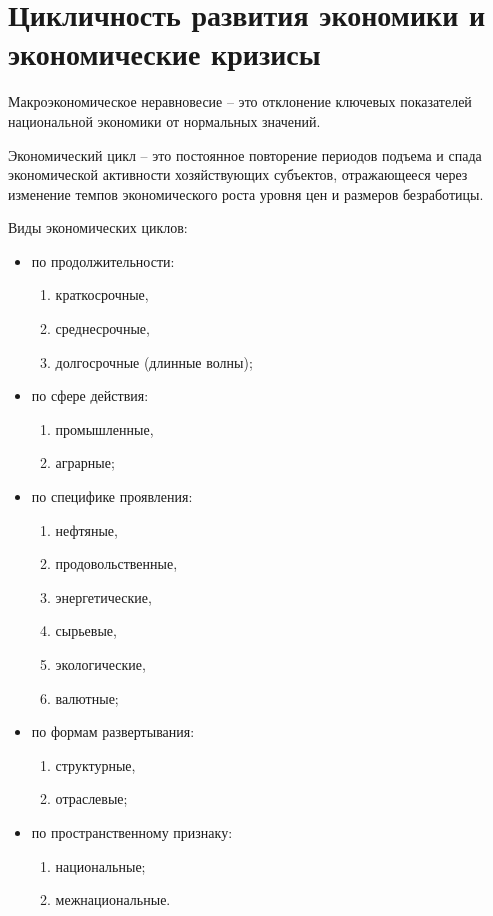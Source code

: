 \section{Цикличность развития экономики и экономические кризисы}

Макроэкономическое неравновесие -- это отклонение ключевых показателей
национальной экономики от нормальных значений.

Экономический цикл -- это постоянное повторение периодов подъема и спада
экономической активности хозяйствующих субъектов, отражающееся через изменение
темпов экономического роста уровня цен и размеров безработицы.

Виды экономических циклов:
\begin{itemize}
    \item по продолжительности:
    \begin{enumerate}
        \item краткосрочные,
        \item среднесрочные,
        \item долгосрочные (длинные волны);
    \end{enumerate}
    \item по сфере действия:
    \begin{enumerate}
        \item промышленные,
        \item аграрные;
    \end{enumerate}
    \item по специфике проявления:
    \begin{enumerate}
        \item нефтяные,
        \item продовольственные,
        \item энергетические,
        \item сырьевые,
        \item экологические,
        \item валютные;
    \end{enumerate}
    \item по формам развертывания:
    \begin{enumerate}
        \item структурные,
        \item отраслевые;
    \end{enumerate}
    \item по пространственному признаку:
    \begin{enumerate}
        \item национальные;
        \item межнациональные.
    \end{enumerate}
\end{itemize}

